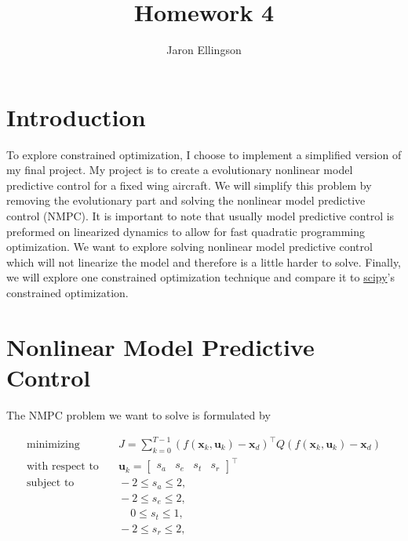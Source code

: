 \documentclass{article}
\begin{document}
\title{Homework 4}
\author{Jaron Ellingson}
\maketitle


\section*{Introduction}

To explore constrained optimization, I choose to implement a simplified version of my final project. My project is to create a evolutionary nonlinear model predictive control for a fixed wing aircraft. We will simplify this problem by removing the evolutionary part and solving the nonlinear model predictive control (NMPC). It is important to note that usually model predictive control is preformed on linearized dynamics to allow for fast quadratic programming optimization. We want to explore solving nonlinear model predictive control which will not linearize the model and therefore is a little harder to solve. Finally, we will explore one constrained optimization technique and compare it to \href{https://docs.scipy.org/doc/scipy/reference/generated/scipy.optimize.minimize.html}{scipy}'s constrained optimization.



\section*{Nonlinear Model Predictive Control}

The NMPC problem we want to solve is formulated by

\begin{equation}
\label{eq:objective}
\begin{aligned}
\text{minimizing} & \quad J= \sum_{k=0}^{T-1} (f(\mathbf{x}_k,\mathbf{u}_k)-\mathbf{x}_{d})^{\top} Q (f(\mathbf{x}_k,\mathbf{u}_k)-\mathbf{x}_{d}) \\
\text{with respect to} & \quad \mathbf{u}_k =\begin{bmatrix}s_{a} & s_{e} & s_{t} & s_{r}\end{bmatrix}^{\top} \\
\text{subject to} & \quad -2 \le s_{a} \le 2, \\
& \quad -2 \le s_{e} \le 2, \\
& \quad \hspace{13pt} 0 \le s_{t} \le 1, \\
& \quad -2 \le s_{r} \le 2,
\end{aligned}
\end{equation}
\end{document}
